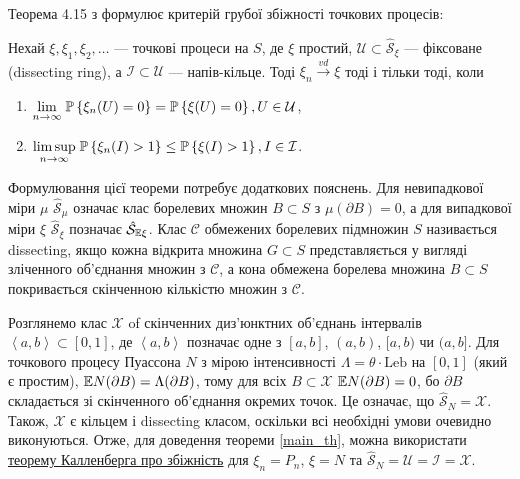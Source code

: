Теорема 4.15 з \cite{Kallenberg_2017} формулює критерій грубої збіжності
точкових процесів:
\begin{theorem*}\label{kallenberg_th}
    Нехай $\xi, \xi_1, \xi_2, \dots $ --- точкові процеси на $S$,
    де $\xi$ простий, $\mathcal{U} \subset \hat{\mathcal{S}}_\xi$ --- фіксоване 
    {\color{red} (dissecting ring)}, а $\mathcal{I}\subset\mathcal{U}$ --- напів-кільце. 
    Тоді 
    $\xi_n \overset{vd}{\longrightarrow} \xi$ тоді і тільки тоді, коли
    \begin{enumerate}
        \item $\underset{n\to\infty}{\lim}\;\P{\xi_n(U) = 0} = \P{\xi(U) = 0}, U\in\mathcal{U}$,
        \item $\underset{n\to\infty}{\limsup}\; \P{\xi_n(I) > 1} \leq \P{\xi(I) > 1}, I \in \mathcal{I}$.
    \end{enumerate}
\end{theorem*}

Формулювання цієї теореми потребує додаткових пояснень.
Для невипадкової міри $\mu$ $\hat{\mathcal{S}}_\mu$
означає клас борелевих множин $B \subset S$ з $\mu(\partial B) = 0$,
а для випадкової міри $\xi$ $\hat{\mathcal{S}}_\xi$ позначає
$\hat{\mathcal{S}}_{\E\xi}$. 
Клас $\mathcal{C}$ обмежених борелевих підмножин $S$ називається
{\color{red}dissecting}, якщо кожна відкрита множина
$G \subset S$ представляється у вигляді зліченного об'єднання множин з $\mathcal{C}$,
а кона обмежена борелева множина $B \subset S$ 
покривається скінченною кількістю множин з $\mathcal{C}$.

Розглянемо клас $\mathcal{X}$ of 
скінченних диз'юнктних об'єднань інтервалів $\left<a,b\right> \subset [0, 1]$,
де $\left<a,b\right>$ позначає одне з $[a, b]$, $(a, b)$, $[a, b)$ чи $(a, b]$.
Для точкового процесу Пуассона $N$
з мірою інтенсивності $\Lambda = \theta \cdot \mathrm{Leb}$ на $[0, 1]$ 
(який є простим),
$\E N(\partial B) = \Lambda (\partial B)$, тому 
для всіх $B \subset \mathcal{X}$ $\E N(\partial B) = 0$, бо
$\partial B$ складається зі скінченного об'єднання окремих точок.
Це означає, що $\hat{\mathcal{S}}_N = \mathcal{X}$.
Також, $\mathcal{X}$ є кільцем і {\color{red}dissecting} класом, оскільки всі необхідні
умови очевидно виконуються.
Отже, для доведення теореми \ref{main_th}, можна використати
\hyperref[kallenberg_th]{теорему Калленберга про збіжність}
для $\xi_n = P_n$, $\xi = N$ та
$\hat{\mathcal{S}}_N = \mathcal{U} = \mathcal{I} = \mathcal{X}$.

